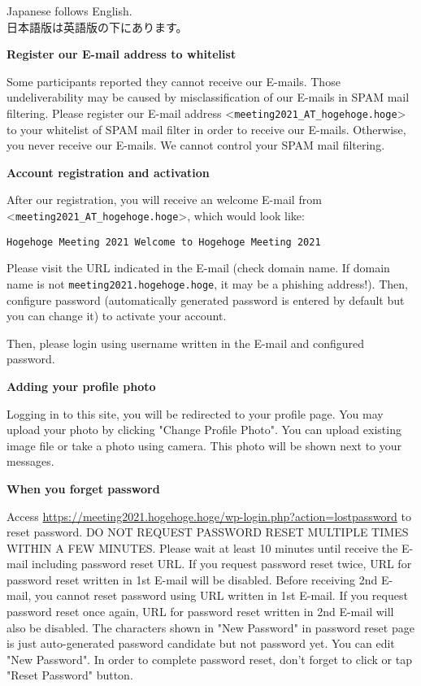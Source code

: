 \documentclass[titlepage,10pt,a4paper,uplatex]{jsbook}
\newenvironment{content}{\begin{shaded}\vspace{-1em}\raggedright\ttfamily\footnotesize\setlength{\baselineskip}{1.4em}}{\end{shaded}\vspace{-1em}}
\renewcommand{\textbf}[1]{{\bfseries\sffamily#1}}
\begin{document}
\begin{content}
Japanese follows English.\\
日本語版は英語版の下にあります。

\textbf{\Large Register our E-mail address to whitelist}

Some participants reported they cannot receive our E-mails. Those undeliverability may be caused by misclassification of our E-mails in SPAM mail filtering. Please register our E-mail address {\textless}\texttt{meeting2021\_AT\_hogehoge.hoge}{\textgreater} to your whitelist of SPAM mail filter in order to receive our E-mails. Otherwise, you never receive our E-mails. We cannot control your SPAM mail filtering.

\textbf{\Large Account registration and activation}

After our registration, you will receive an welcome E-mail from {\textless}\texttt{meeting2021\_AT\_hogehoge.hoge}{\textgreater}, which would look like:

\texttt{{\lbrack}Hogehoge Meeting 2021{\rbrack} Welcome to Hogehoge Meeting 2021}

Please visit the URL indicated in the E-mail (check domain name. If domain name is not \texttt{meeting2021.hogehoge.hoge}, it may be a phishing address!). Then, configure password (automatically generated password is entered by default but you can change it) to activate your account.

Then, please login using username written in the E-mail and configured password.

\textbf{\Large Adding your profile photo}

Logging in to this site, you will be redirected to your profile page. You may upload your photo by clicking "Change Profile Photo". You can upload existing image file or take a photo using camera. This photo will be shown next to your messages.

\textbf{\Large When you forget password}

Access \url{https://meeting2021.hogehoge.hoge/wp-login.php?action=lostpassword} to reset password. DO NOT REQUEST PASSWORD RESET MULTIPLE TIMES WITHIN A FEW MINUTES. Please wait at least 10 minutes until receive the E-mail including password reset URL. If you request password reset twice, URL for password reset written in 1st E-mail will be disabled. Before receiving 2nd E-mail, you cannot reset password using URL written in 1st E-mail. If you request password reset once again, URL for password reset written in 2nd E-mail will also be disabled. The characters shown in "New Password" in password reset page is just auto-generated password candidate but not password yet. You can edit "New Password". In order to complete password reset, don't forget to click or tap "Reset Password" button.


\end{content}
\end{document}
